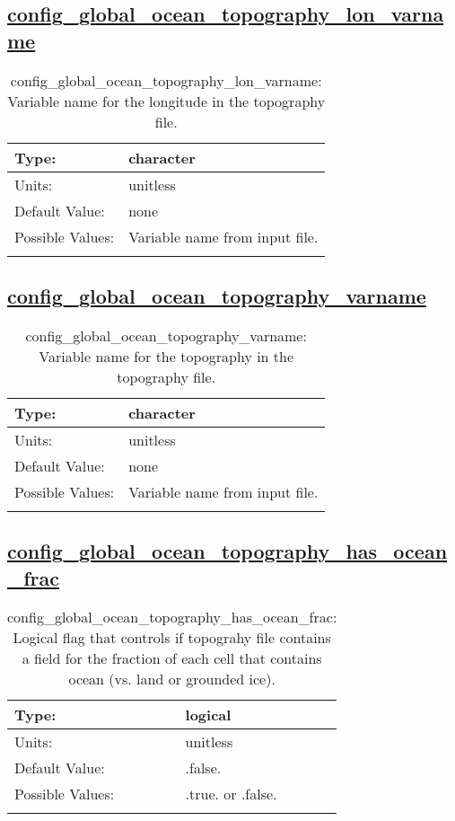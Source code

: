 \subsection[config\_global\_ocean\_topography\_lon\_varname]{\hyperref[sec:nm_tab_global_ocean]{config\_global\_ocean\_topography\_lon\_varname}}
\label{subsec:nm_sec_config_global_ocean_topography_lon_varname}
\begin{center}
\begin{longtable}{| p{2.0in} || p{4.0in} |}
    \hline
    Type: & character \\
    \hline
    Units: & \si{unitless} \\
    \hline
    Default Value: & none \\
    \hline
    Possible Values: & Variable name from input file. \\
    \hline
    \caption{config\_global\_ocean\_topography\_lon\_varname: Variable name for the longitude in the topography file.}
\end{longtable}
\end{center}
\subsection[config\_global\_ocean\_topography\_varname]{\hyperref[sec:nm_tab_global_ocean]{config\_global\_ocean\_topography\_varname}}
\label{subsec:nm_sec_config_global_ocean_topography_varname}
\begin{center}
\begin{longtable}{| p{2.0in} || p{4.0in} |}
    \hline
    Type: & character \\
    \hline
    Units: & \si{unitless} \\
    \hline
    Default Value: & none \\
    \hline
    Possible Values: & Variable name from input file. \\
    \hline
    \caption{config\_global\_ocean\_topography\_varname: Variable name for the topography in the topography file.}
\end{longtable}
\end{center}
\subsection[config\_global\_ocean\_topography\_has\_ocean\_frac]{\hyperref[sec:nm_tab_global_ocean]{config\_global\_ocean\_topography\_has\_ocean\_frac}}
\label{subsec:nm_sec_config_global_ocean_topography_has_ocean_frac}
\begin{center}
\begin{longtable}{| p{2.0in} || p{4.0in} |}
    \hline
    Type: & logical \\
    \hline
    Units: & \si{unitless} \\
    \hline
    Default Value: & .false. \\
    \hline
    Possible Values: & .true. or .false. \\
    \hline
    \caption{config\_global\_ocean\_topography\_has\_ocean\_frac: Logical flag that controls if topograhy file contains a field for the fraction of each cell that contains ocean (vs. land or grounded ice).}
\end{longtable}
\end{center}
